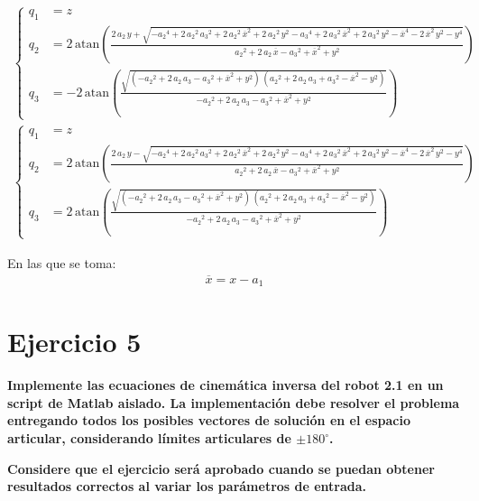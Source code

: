 \documentclass[a4paper,12pt]{article}
\begin{document}
\begin{align*}
    \begin{cases}
        q_1 &= z\\
        q_2 &=  2\,\mathrm{atan}\left(\frac{2\,a_{2}\,y+\sqrt{-{a_{2}}^4+2\,{a_{2}}^2\,{a_{3}}^2+2\,{a_{2}}^2\,\overline{x}^2+2\,{a_{2}}^2\,y^2-{a_{3}}^4+2\,{a_{3}}^2\,\overline{x}^2+2\,{a_{3}}^2\,y^2-\overline{x}^4-2\,\overline{x}^2\,y^2-y^4}}{{a_{2}}^2+2\,a_{2}\,\overline{x}-{a_{3}}^2+\overline{x}^2+y^2}\right)\\
        q_3 &= -2\,\mathrm{atan}\left(\frac{\sqrt{\left(-{a_{2}}^2+2\,a_{2}\,a_{3}-{a_{3}}^2+\overline{x}^2+y^2\right)\,\left({a_{2}}^2+2\,a_{2}\,a_{3}+{a_{3}}^2-\overline{x}^2-y^2\right)}}{-{a_{2}}^2+2\,a_{2}\,a_{3}-{a_{3}}^2+\overline{x}^2+y^2}\right)
    \end{cases}
\end{align*}
\begin{align*}
    \begin{cases}
        q_1 &= z\\
        q_2 &= 2\,\mathrm{atan}\left(\frac{2\,a_{2}\,y-\sqrt{-{a_{2}}^4+2\,{a_{2}}^2\,{a_{3}}^2+2\,{a_{2}}^2\,\overline{x}^2+2\,{a_{2}}^2\,y^2-{a_{3}}^4+2\,{a_{3}}^2\,\overline{x}^2+2\,{a_{3}}^2\,y^2-\overline{x}^4-2\,\overline{x}^2\,y^2-y^4}}{{a_{2}}^2+2\,a_{2}\,\overline{x}-{a_{3}}^2+\overline{x}^2+y^2}\right)\\
        q_3 &= 2\,\mathrm{atan}\left(\frac{\sqrt{\left(-{a_{2}}^2+2\,a_{2}\,a_{3}-{a_{3}}^2+\overline{x}^2+y^2\right)\,\left({a_{2}}^2+2\,a_{2}\,a_{3}+{a_{3}}^2-\overline{x}^2-y^2\right)}}{-{a_{2}}^2+2\,a_{2}\,a_{3}-{a_{3}}^2+\overline{x}^2+y^2}\right)
    \end{cases}
\end{align*}

En las que se toma:
\begin{align*}
    \overline{x} = x-a_1
\end{align*}

\section{Ejercicio 5}
\textbf{Implemente las ecuaciones de cinemática inversa del robot 2.1 en un
script de Matlab aislado. La implementación debe resolver el problema entregando todos los
posibles vectores de solución en el espacio articular, considerando límites articulares de
$\pm180^\circ$.}

\textbf{Considere que el ejercicio será aprobado cuando se puedan obtener resultados correctos al
variar los parámetros de entrada.}
\end{document}
